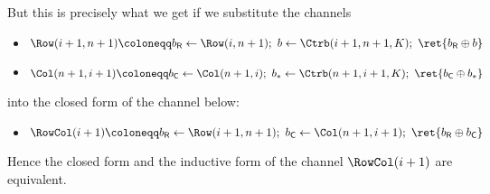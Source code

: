 \begin{itemize}
But this is precisely what we get if we substitute the channels
\begin{itemize}
\item $\Row(i+1,n+1) \coloneqq b_\mathsf{R} \leftarrow \Row(i,n+1); \ b \leftarrow \Ctrb(i+1,n+1,K); \ \ret{b_\mathsf{R} \oplus b}$
\item $\Col(n+1,i+1) \coloneqq b_\mathsf{C} \leftarrow \Col(n+1,i); \ b_* \leftarrow \Ctrb(n+1,i+1,K); \ \ret{b_\mathsf{C} \oplus b_*}$
\end{itemize}
into the closed form of the channel below:
\begin{itemize}
\item $\RowCol(i+1) \coloneqq b_\mathsf{R} \leftarrow \Row(i+1,n+1); \ b_\mathsf{C} \leftarrow \Col(n+1,i+1); \ \ret{b_\mathsf{R} \oplus b_\mathsf{C}}$
\end{itemize}
Hence the closed form and the inductive form of the channel $\RowCol(i+1)$ are equivalent.


\end{itemize}
